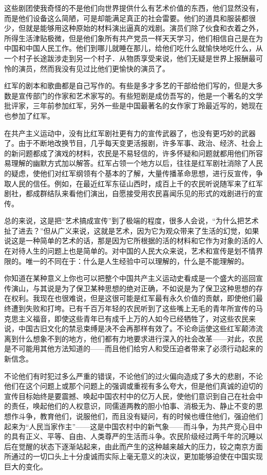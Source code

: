 \documentclass[10pt]{book}
\begin{document}
这些剧团使我奇怪的不是他们向世界提供什么有艺术价值的东西，他们显然没有，而是他们设备这么简陋，可是却能满足真正的社会雷要。他们的道具和服装都很少，但就是能够用这种原始的材料演出逼真的戏剧。演员们除了伙食和衣着之外，所得生活津贴极微，但是他们象所有共产党员一样天天学习，他们相信自己是在为中国和中国人民工作。他们到哪儿就睡在那儿，给他们吃什么就愉快地吃什么，从一个村子长途跋涉走到另一个村子．从物质享受来说，他们无疑是世界上报酬最可怜的演员，然而我没有见过比他们更愉快的演员了。

红军的剧本和歌曲都是自己写作的。有些是多才多艺的干部给他们写的，但是大多数是宣传部门的作家和艺术家写的。有些短剧是成仿吾写的，他是一个著名的文学批评家，三年前参加红军，另外一些是中国最著名的女作家丁玲最近写的，她现在也参加了红军。

在共产主义运动中，没有比红军剧社更有力的宣传武器了，也没有更巧妙的武器了。由于不断地改换节目，几乎每天变更活报剧，许多军事、政治、经济、社会上的新问题都成了演戏的材料，农民是不易轻信的，许多怀疑和问题就都用他们所容易理解的幽默方式加以解答。红军占领一个地方以后，往往是红军剧社消除了人民的疑虑，使他们对红军纲领有个基本的了解，大量传播革命思想，进行反宣传，争取人民的信任。例如，在最近红军东征山西时，成百上千的农民听说随军来了红军剧社，都成群结队来看他们演出，自愿接受用农民喜闻乐见的形式的戏剧进行的宣传。

总的来说，这是把“艺术搞成宣传”到了极端的程度，很多人会说，“为什么把艺术扯了进去？”但从广义来说，这就是艺术，因为它为观众带来了生活的幻觉，如果说这是一种简单的艺术的话，那是因为它所根据的活的材料和它作为对象的活的人在对待人生的问题上也是简单的。对中国的人民大众来说，艺术和宣传是划不情界限的。唯一的不同在于：什么是人生经验中可以理解的，什么是不能理解的。

你知道在某种意义上你也可以把整个中国共产主义运动史看成是一个盛大的巡回宣传演山，与其说是为了保卫某种思想的绝对正确，不如说是为了保卫这种思想的存在权利。我现在也很难说，但是这很可能是红军最有永久价值的贡献，即使他们最终遭到失败和打垮。已有千百万年轻的农民听到了这些嘴上无毛的青年所宣传的马克思主义福音，即使这些青年已有成千上万的人如今已经牺牲了，对这些农民来说，中国古旧文化的禁忌束缚是决不会再那样有效了。不论命运使这些红军颠沛流离到什么想象不到的地方，他们都有力地要求进行深入的社会改革——对此，农民是不可能用其他方法知道的——而且他们给穷人和受压迫者带来了必须行动起来的新信念。

不论他们有时犯过多么严重的错误，不论他们的过火偏向造成了多大的悲剧，不论他们在这个问题上或那个问题上的强调或重视有多么夸大，但是他们真诚的迫切的宣传目标始终是要震撼、唤起中国农村中的亿万人民，使他们意识到自己在社会中的责任，唤起他们的人权意识，同儒道两教的胆小怕事、消极无为、静止不变的思想作斗争，教育他们，说服他们，而且没有疑问，有的时候也缠住他们，强迫他们起来为“人民当家作主”——这是中国农村中的新气象——而斗争，为共产竞心目中的具有正义、平等、自由、人类尊严的生活而斗争。农民阶级经过两千年的沉睡以后在觉醒的状态下逐渐站起来，由此而产生的这种越来越大的压力，较之南京方面所通过的一切口头上十分虔诚而实际上毫无意义的决议，更加能够迫使在中国实现巨大的变化。
\end{document}
